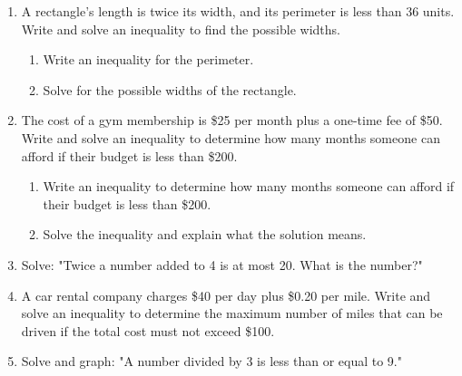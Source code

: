 \documentclass[12pt]{article}
\begin{document}
\begin{tcolorbox}[colframe=black!60, colback=white, 
coltitle=black, colbacktitle=black!15, fonttitle=\bfseries\Large, 
title=Problems, halign title=center, left=10pt, right=10pt, top=10pt, bottom=100pt]
\begin{enumerate}[start=9, itemsep=6em]
    \item A rectangle's length is twice its width, and its perimeter is less than 36 units. Write and solve an inequality to find the possible widths.
     \begin{enumerate}[label=(\alph*)]
        \item Write an inequality for the perimeter.  
        \item Solve for the possible widths of the rectangle.  
    \end{enumerate} 
    \item The cost of a gym membership is \$25 per month plus a one-time fee of \$50. Write and solve an inequality to determine how many months someone can afford if their budget is less than \$200.
     \begin{enumerate}[label=(\alph*)]
        \item Write an inequality to determine how many months someone can afford if their budget is less than \$200.  
        \item Solve the inequality and explain what the solution means.  
    \end{enumerate}  
    \item Solve: "Twice a number added to 4 is at most 20. What is the number?"
    \item A car rental company charges \$40 per day plus \$0.20 per mile. Write and solve an inequality to determine the maximum number of miles that can be driven if the total cost must not exceed \$100.
    \item Solve and graph: "A number divided by 3 is less than or equal to 9."
\end{enumerate}
\end{tcolorbox}

\vspace{1em}
\end{document}
